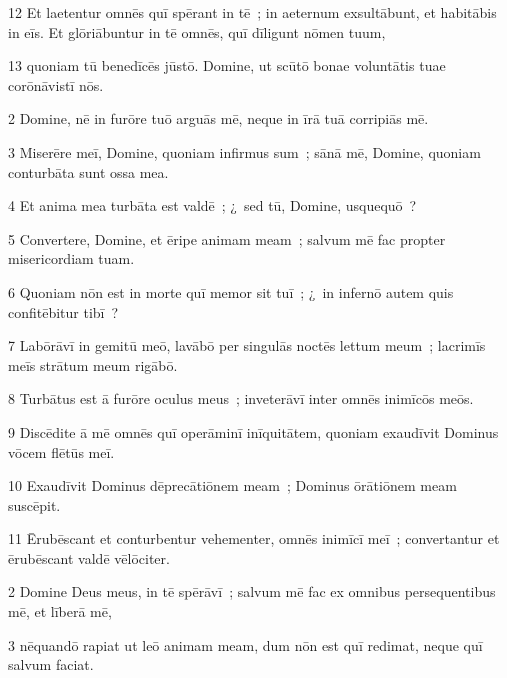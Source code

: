 \psalmVerse
  {\phantom{0}12}
  {Et laetentur omnēs quī spērant in tē~; in aeternum exsultābunt, et habitābis in eīs. Et glōriābuntur in tē omnēs, quī dīligunt nōmen tuum,}


\psalmVerse
  {\phantom{0}13}
  {quoniam tū benedīcēs jūstō. Domine, ut scūtō bonae voluntātis tuae corōnāvistī nōs.}



\psalmVerse
  {\phantom{00}2}
  {Domine, nē in furōre tuō arguās mē, neque in īrā tuā corripiās mē.}


\psalmVerse
  {\phantom{00}3}
  {Miserēre meī, Domine, quoniam infirmus sum~; sānā mē, Domine, quoniam conturbāta sunt ossa mea.}


\psalmVerse
  {\phantom{00}4}
  {Et anima mea turbāta est valdē~; ¿~sed tū, Domine, usquequō~?}


\psalmVerse
  {\phantom{00}5}
  {Convertere, Domine, et ēripe animam meam~; salvum mē fac propter misericordiam tuam.}


\psalmVerse
  {\phantom{00}6}
  {Quoniam nōn est in morte quī memor sit tuī~; ¿~in infernō autem quis confitēbitur tibī~?}


\psalmVerse
  {\phantom{00}7}
  {Labōrāvī in gemitū meō, lavābō per singulās noctēs lettum meum~; lacrimīs meīs strātum meum rigābō.}


\psalmVerse
  {\phantom{00}8}
  {Turbātus est ā furōre oculus meus~; inveterāvī inter omnēs inimīcōs meōs.}


\psalmVerse
  {\phantom{00}9}
  {Discēdite ā mē omnēs quī operāminī inīquitātem, quoniam exaudīvit Dominus vōcem flētūs meī.}


\psalmVerse
  {\phantom{0}10}
  {Exaudīvit Dominus dēprecātiōnem meam~; Dominus ōrātiōnem meam suscēpit.}


\psalmVerse
  {\phantom{0}11}
  {Ērubēscant et conturbentur vehementer, omnēs inimīcī meī~; convertantur et ērubēscant valdē vēlōciter.}




\psalmVerse
  {\phantom{00}2}
  {Domine Deus meus, in tē spērāvī~; salvum mē fac ex omnibus persequentibus mē, et līberā mē,}


\psalmVerse
  {\phantom{00}3}
  {nēquandō rapiat ut leō animam meam, dum nōn est quī redimat, neque quī salvum faciat.}


